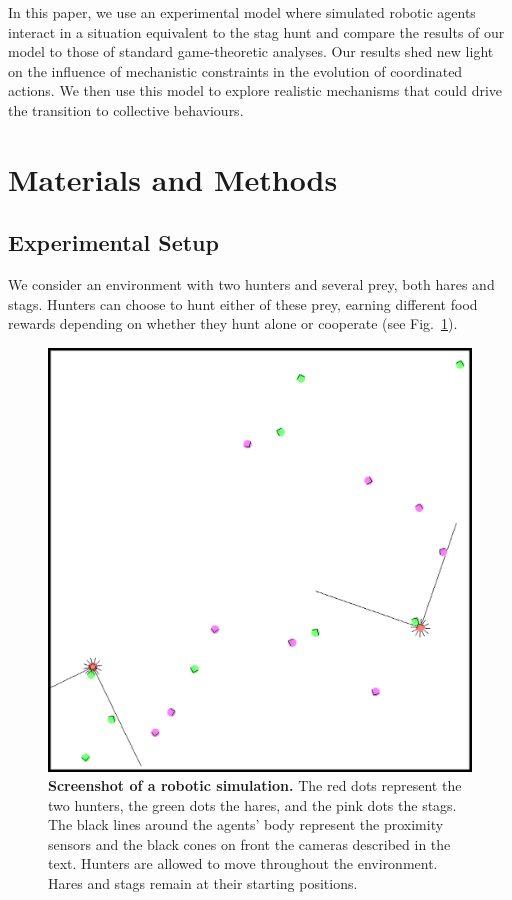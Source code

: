   In this paper, we use an experimental model where simulated robotic agents interact in a situation equivalent to the stag hunt and compare the results of our model to those of standard game-theoretic analyses. Our results shed new light on the influence of mechanistic constraints in the evolution of coordinated actions. We then use this model to explore realistic mechanisms that could drive the transition to collective behaviours.


\section{Materials and Methods}
\label{sec:methods}
  \subsection{Experimental Setup}
  \label{setup}
    We consider an environment with two hunters and several prey, both hares and stags. Hunters can choose to hunt either of these prey, earning different food rewards depending on whether they hunt alone or cooperate (see Fig.~\ref{fig:figureSimulation}).

    \begin{figure}[h]
      \centering
        \includegraphics[scale = 0.40]{fig/ArticleBio1/Fig1.eps}
      \caption{\textbf{Screenshot of a robotic simulation.} 
      The red dots represent the two hunters, the green dots the hares, and the pink dots the stags. The black lines around the agents' body represent the proximity sensors and the black cones on front the cameras described in the text. Hunters are allowed to move throughout the environment. Hares and stags remain at their starting positions.}
      \label{fig:figureSimulation}
    \end{figure}

